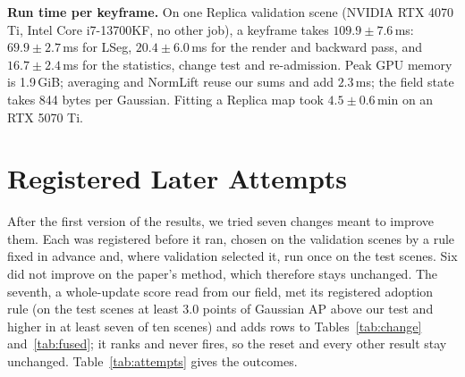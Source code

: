 \documentclass[journal]{IEEEtran}
\begin{document}
\textbf{Run time per keyframe.} On one Replica validation scene (NVIDIA RTX 4070 Ti, Intel Core i7-13700KF, no other job), a keyframe takes $109.9\pm7.6$\,ms: $69.9\pm2.7$\,ms for LSeg, $20.4\pm6.0$\,ms for the render and backward pass, and $16.7\pm2.4$\,ms for the statistics, change test and re-admission. Peak GPU memory is 1.9\,GiB; averaging and NormLift reuse our sums and add $2.3$\,ms; the field state takes 844 bytes per Gaussian. Fitting a Replica map took $4.5\pm0.6$\,min on an RTX 5070 Ti.

\section{Registered Later Attempts}
\label{supp:attempts}
After the first version of the results, we tried seven changes meant to improve them. Each was registered before it ran, chosen on the validation scenes by a rule fixed in advance and, where validation selected it, run once on the test scenes. Six did not improve on the paper's method, which therefore stays unchanged. The seventh, a whole-update score read from our field, met its registered adoption rule (on the test scenes at least 3.0 points of Gaussian AP above our test and higher in at least seven of ten scenes) and adds rows to Tables~\ref{tab:change} and~\ref{tab:fused}; it ranks and never fires, so the reset and every other result stay unchanged. Table~\ref{tab:attempts} gives the outcomes.
\end{document}
